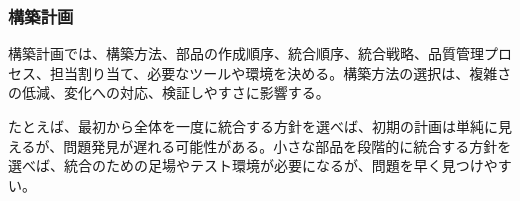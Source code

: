 \subsubsection{構築計画}

構築計画では、構築方法、部品の作成順序、統合順序、統合戦略、品質管理プロセス、担当割り当て、必要なツールや環境を決める。構築方法の選択は、複雑さの低減、変化への対応、検証しやすさに影響する。

たとえば、最初から全体を一度に統合する方針を選べば、初期の計画は単純に見えるが、問題発見が遅れる可能性がある。小さな部品を段階的に統合する方針を選べば、統合のための足場やテスト環境が必要になるが、問題を早く見つけやすい。
